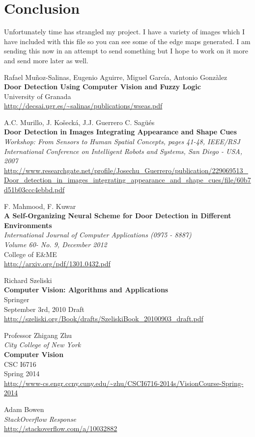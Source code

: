 \documentclass[twocolumn,nofootinbib,%
notitlepage,10pt]{report}
\begin{document}
\section*{Conclusion}
Unfortunately time has strangled my project. I have a variety of images which I have included with this file so you can see some of the edge maps generated. I am sending this now in an attempt to send something but I hope to work on it more and send more later as well.

\begin{thebibliography}{30}

Rafael Mu{\~n}oz-Salinas, Eugenio Aguirre, Miguel Garc{\'i}a,  Antonio Gonz{\`a}lez\\
\textbf{Door Detection Using Computer Vision and Fuzzy Logic}\\
University of Granada\\
\url{http://decsai.ugr.es/~salinas/publications/wseas.pdf}

A.C. Murillo, J. Ko{\v s}eck{\' a}, J.J. Guerrero C. Sag{\" u}{\' e}s\\
\textbf{Door Detection in Images Integrating Appearance and Shape Cues}\\
\emph{Workshop: From Sensors to Human Spatial Concepts, pages 41-48, IEEE/RSJ International Conference on Intelligent Robots and Systems, San Diego - USA, 2007}\\
\url{http://www.researchgate.net/profile/Josechu_Guerrero/publication/229069513_Door_detection_in_images_integrating_appearance_and_shape_cues/file/60b7d51b03ccc4ebbd.pdf}

F. Mahmood, F. Kuwar\\
\textbf{A Self-Organizing Neural Scheme for Door Detection in Different Environments}\\
\emph{International Journal of Computer Applications (0975 - 8887)}\\
\emph{Volume 60- No. 9, December 2012}\\
College of E\&ME\\
\url{http://arxiv.org/pdf/1301.0432.pdf}

Richard Szeliski\\
\textbf{Computer Vision: Algorithms and Applications}\\
Springer\\
September 3rd, 2010 Draft\\
\url{http://szeliski.org/Book/drafts/SzeliskiBook_20100903_draft.pdf}

Professor Zhigang Zhu\\
\emph{City College of New York}\\
\textbf{Computer Vision}\\
CSC I6716\\
Spring 2014\\
\url{http://www-cs.engr.ccny.cuny.edu/~zhu/CSCI6716-2014s/VisionCourse-Spring-2014}

Adam Bowen\\
\emph{StackOverflow Response}\\
\url{http://stackoverflow.com/a/10032882}

\end{thebibliography}
\end{document}
